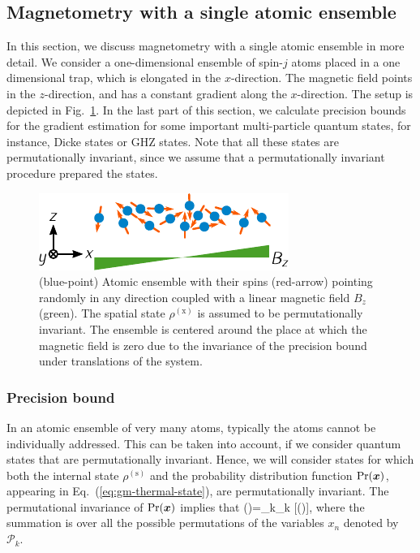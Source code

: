\subsection{Magnetometry with a single atomic ensemble}
\label{sec:gm-single-cloud}

In this section, we discuss magnetometry with a single
atomic ensemble in more detail.
We consider a one-dimensional ensemble of spin-$j$ atoms
placed in a one dimensional trap, which is elongated
in the  $x$-direction.
The magnetic field points in the $z$-direction,
and has a constant gradient along the $x$-direction.
The setup is depicted
in Fig.~\ref{fig:gm-single-ensemble-in-gradient}.
In the last part of this section, we calculate precision bounds for the
gradient estimation for some important multi-particle quantum states,
for instance, Dicke states or GHZ states.
Note that all these states are permutationally invariant, since we
assume that a permutationally invariant procedure prepared the states.
\begin{figure}[htp]
  \begin{center}
  \includegraphics[scale=1.2]{img/GM_single_cloud.pdf}
  \caption[Single atomic ensemble for gradient magnetometry]{
  (blue-point) Atomic ensemble with their spins (red-arrow) pointing randomly in any direction coupled with a linear magnetic field $B_z$ (green).
  The spatial state $\rho^{(\text{x})}$ is assumed to be permutationally invariant.
  The ensemble is centered around the place at which the magnetic field is zero due to the invariance of the precision bound under translations of the system.}
  \label{fig:gm-single-ensemble-in-gradient}
  \end{center}
\end{figure}

\subsubsection{Precision bound}

In an atomic ensemble of very many atoms, typically
the atoms cannot be individually addressed.
This can be taken into account, if we consider
quantum states that are permutationally invariant.
Hence, we will consider states for which both the internal state $\rho^{(\text{s})}$ and the probability distribution function
$\text{Pr}(\boldsymbol{x})$, appearing in Eq.~(\ref{eq:gm-thermal-state}),
are permutationally invariant.
The permutational invariance of $\text{Pr}(\boldsymbol{x})$ implies that
\be
  \label{eq:pi-for-pdf}
  \prob()=\sum_{k}_k [\prob()],
\ee
where the summation is over all the possible permutations of the variables $x_n$ denoted by $\mathcal{P}_k$.

